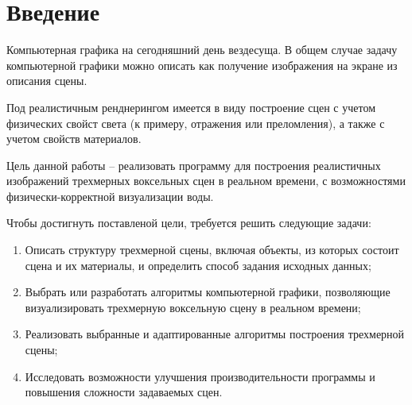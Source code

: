 \section*{Введение}

Компьютерная графика на сегодняшний день вездесуща. В общем случае 
задачу компьютерной графики можно описать как получение изображения 
на экране из описания сцены. 

Под реалистичным ренднерингом имеется в виду построение сцен
с учетом физических свойст света (к примеру, отражения или преломления), 
а также с учетом свойств материалов.

Цель данной работы -- реализовать программу для построения 
реалистичных изображений трехмерных воксельных сцен в реальном времени,
с возможностями физически-корректной визуализации воды.

Чтобы достигнуть поставленой цели, требуется решить следующие задачи:

\begin{enumerate}
    \item Описать структуру трехмерной сцены, включая объекты, из которых
          состоит сцена и их материалы, и определить способ задания 
          исходных данных;
    \item Выбрать или разработать алгоритмы компьютерной 
          графики, позволяющие визуализировать трехмерную воксельную
          сцену в реальном времени;
    \item Реализовать выбранные и адаптированные алгоритмы построения 
          трехмерной сцены;
    \item Исследовать возможности улучшения производительности программы
          и повышения сложности задаваемых сцен.
\end{enumerate}
